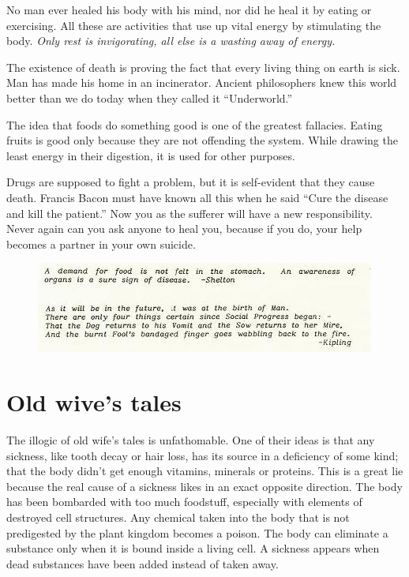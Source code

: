 \documentclass[12pt,letterpaper]{article}
\begin{document}
No man ever healed his body with his mind, nor did he heal it by
eating or exercising. All these are activities that use up vital
energy by stimulating the body. \emph{Only rest is invigorating, all
else is a wasting away of energy.}

The existence of death is proving the fact that every living thing on
earth is sick. Man has made his home in an incinerator. Ancient
philosophers knew this world better than we do today when they called
it ``Underworld.''

The idea that foods do something good is one of the greatest
fallacies. Eating fruits is good only because they are not offending
the system. While drawing the least energy in their digestion, it is
used for other purposes.

Drugs are supposed to fight a problem, but it is self-evident that
they cause death. Francis Bacon must have known all this when he said
``Cure the disease and kill the patient.'' Now you as the sufferer
will have a new responsibility. Never again can you ask anyone to heal
you, because if you do, your help becomes a partner in your own
suicide.

\begin{figure} \centering
  \includegraphics[width=\textwidth]{p26quotes.jpg}
\end{figure}


\section{Old wive's tales}
\label{sec:owt}

The illogic of old wife's tales is unfathomable. One of their ideas is
that any sickness, like tooth decay or hair loss, has its source in a
deficiency of some kind; that the body didn't get enough vitamins,
minerals or proteins. This is a great lie because the real cause of a
sickness likes in an exact opposite direction. The body has been
bombarded with too much foodstuff, especially with elements of
destroyed cell structures. Any chemical taken into the body that is
not predigested by the plant kingdom becomes a poison. The body can
eliminate a substance only when it is bound inside a living cell. A
sickness appears when dead substances have been added instead of taken
away.
\end{document}
